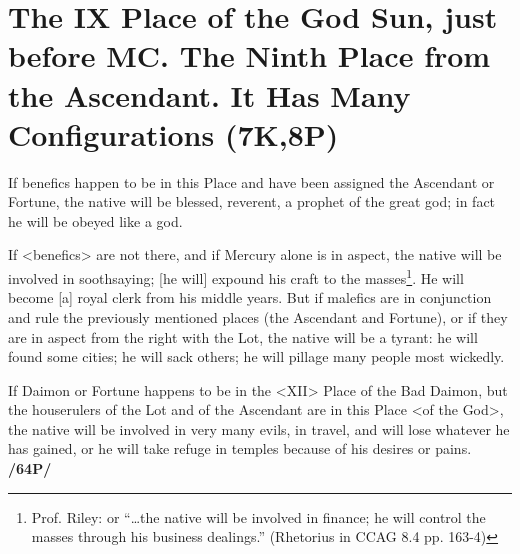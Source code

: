 \section*{The IX Place of the God Sun, just before MC. The Ninth 
Place from the Ascendant. It Has Many Configurations (7K,8P)}
If benefics happen to be in this Place and have been assigned the Ascendant or Fortune, the native will be blessed, reverent, a prophet of the great god; in fact he will be obeyed like a god.

If <benefics> are not there, and if Mercury alone is in aspect, the native will be involved in soothsaying; [he will] expound his craft to the masses\footnote{Prof. Riley: or “…the native will be involved in finance; he will control the masses through his business dealings.” (Rhetorius in CCAG 8.4 pp. 163-4)}. He will become [a] royal clerk from his middle years. But if malefics are in conjunction and rule the previously mentioned places (the Ascendant and Fortune), or if they are in aspect from the right with the Lot, the native will be a tyrant: he will found some cities; he will sack others; he will pillage many people most wickedly. 

 
If Daimon or Fortune happens to be in the <XII> Place of the Bad Daimon, but the houserulers of the Lot and of the Ascendant are in this Place <of the God>, the native will be involved in very many evils, in travel, and will lose whatever he has gained, or he will take refuge in temples because of his desires or pains. \textbf{/64P/}

\newpage